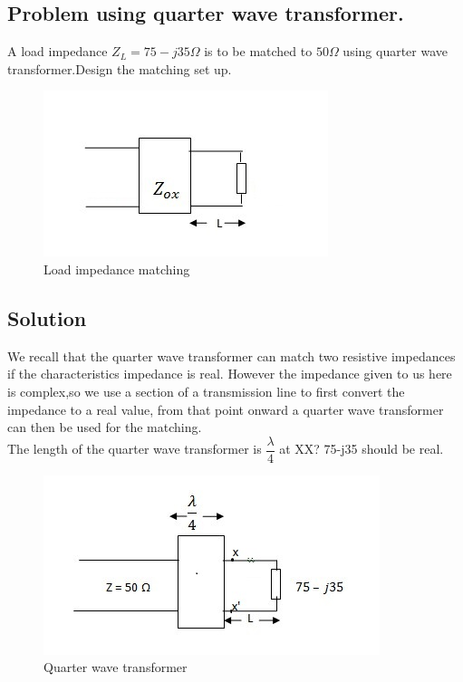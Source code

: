 \begin{example}
\subsection*{Problem using quarter wave transformer.}
A load impedance $Z_{L}=75-j35\Omega$ is to be matched to $50\Omega$ using quarter wave transformer.Design the matching set up. 
\begin{figure}[h]
\centering
\includegraphics[width=1\linewidth]{./graphics/fighalfwave}
\caption{Load impedance matching}
\end{figure}

\subsection*{Solution}
We recall that the quarter wave transformer can match two resistive impedances if the characteristics impedance is real. However the impedance given to us here is complex,so we use a section of a transmission line to first convert the impedance to a real value, from that point onward a quarter wave transformer can then be used for the matching.\\
The length of the quarter wave  transformer is $\dfrac{\lambda}{4}$ at XX? 75-j35 should be real.
\begin{figure}[h]
\centering
\includegraphics[width=1\linewidth]{./graphics/image}
\caption{Quarter wave transformer}
\end{figure}


\end{example}
